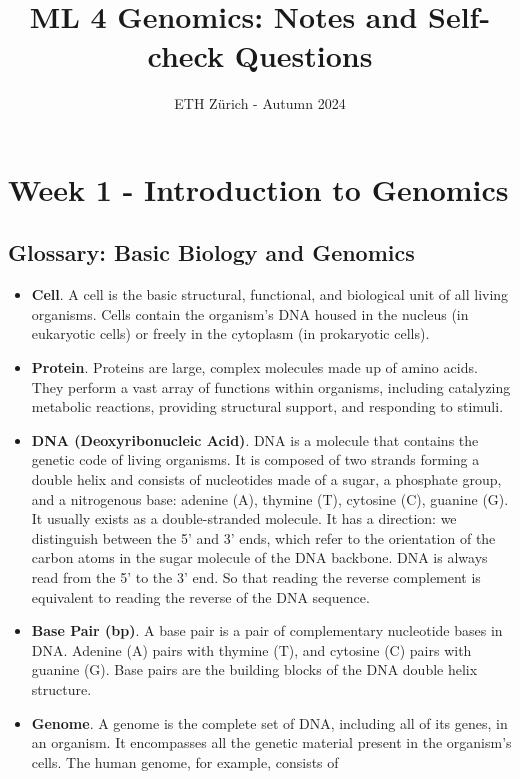 \documentclass[a4paper]{article}
\title{ML 4 Genomics: Notes and Self-check Questions}
\author{ETH Zürich - Autumn 2024 }
\date{}
\begin{document}
\maketitle

\section*{Week 1 - Introduction to Genomics}

\subsection*{Glossary: Basic Biology and Genomics}

\begin{itemize}
  \item \textbf{Cell}. A cell is the basic structural, functional, and biological unit of all living organisms. Cells contain the organism's DNA housed in the nucleus (in eukaryotic cells) or freely in the cytoplasm (in prokaryotic cells).
  \item \textbf{Protein}. Proteins are large, complex molecules made up of amino acids. They perform a vast array of functions within organisms, including catalyzing metabolic reactions, providing structural support, and responding to stimuli.
  \item \textbf{DNA (Deoxyribonucleic Acid)}. DNA is a molecule that contains the genetic code of living organisms. It is composed of two strands forming a double helix and consists of nucleotides made of a sugar, a phosphate group, and a nitrogenous base: adenine (A), thymine (T), cytosine (C), guanine (G).
  It usually exists as a double-stranded molecule. It has a direction: we 
  distinguish between the 5' and 3' ends, which refer to the 
  orientation of the carbon atoms in the sugar molecule of the DNA backbone.
  DNA is always read from the 5' to the 3' end. So that reading
  the reverse complement is equivalent to reading the reverse of the
  DNA sequence.
  \item \textbf{Base Pair (bp)}. A base pair is a pair of complementary 
  nucleotide bases in DNA. 
  Adenine (A) pairs with thymine (T), and cytosine (C) pairs with guanine (G). 
  Base pairs are the building blocks of the DNA double helix structure.
  \item \textbf{Genome}. A genome is the complete set of DNA, including all of 
  its genes, in an organism. It encompasses all the genetic material present in
   the organism's cells. The human genome, for example, consists of 

\end{itemize}
\end{document}
